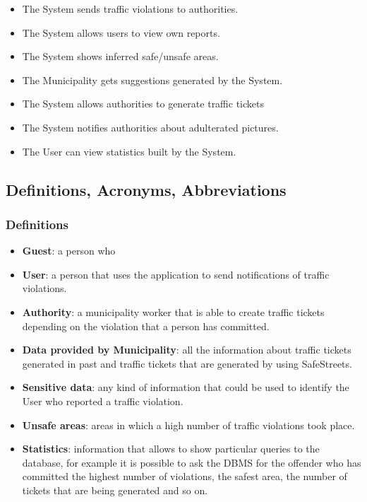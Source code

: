     \begin{itemize}
      \item The System sends traffic violations to authorities.
      \item The System allows users to view own reports.
      \item The System shows inferred safe/unsafe areas.
      \item The Municipality gets suggestions generated by the System.
      \item The System allows authorities to generate traffic tickets
      \item The System notifies authorities about adulterated pictures. 
      \item The User can view  statistics built by the System.
    \end{itemize}

\subsection{Definitions, Acronyms, Abbreviations}
    \subsubsection{Definitions}
        \begin{itemize}
            \item \textbf{Guest}: a person who 
            \item \textbf{User}: a person that uses the application to send notifications of traffic violations.
            \item \textbf{Authority}: a municipality worker that is able to create traffic tickets depending on the violation that a person has committed.
            \item \textbf{Data provided by Municipality}: all the information about traffic tickets generated in past and traffic tickets that are generated by using SafeStreets.
            \item \textbf{Sensitive data}: any kind of information that could be used to identify the User who reported a traffic violation.
            \item \textbf{Unsafe areas}: areas in which a high number of traffic violations took place.
            \item \textbf{Statistics}: information that allows to show particular queries to the database, for example it is possible to ask the DBMS for the offender who has committed the highest number of violations, the safest area, the number of tickets that are being generated and so on.
        \end{itemize}
        
